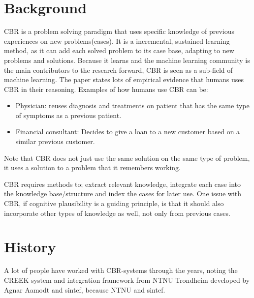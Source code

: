 \documentclass[11pt, letterpaper]{report}
\numberwithin{equation}{section}
\begin{document}
\section{Background}
CBR is a problem solving paradigm that uses specific knowledge of previous
experiences on new problems(cases). It is a incremental, sustained learning
method, as it can add each solved problem to its case base, adapting to new
problems and solutions. Because it learns and
the machine learning community is the main contributors to the research forward,
CBR is seen as a sub-field of machine learning. The paper states lots
of empirical evidence that humans uses CBR in their reasoning. Examples of how
humans use CBR can be:
\begin{itemize}
\item{Physician:} reuses diagnosis and treatments on patient that has the same
  type of symptoms as a previous patient.
\item{Financial consultant:} Decides to give a loan to a new customer based on
    a similar previous customer.
\end{itemize}

Note that CBR does not just use the same solution on the same type of problem,
it uses a solution to a problem that it remembers working.

CBR requires methods to; extract relevant knowledge, integrate each case into
the knowledge base/structure and index the cases for later use. One issue with
CBR, if cognitive plausibility is a guiding principle, is that it should also
incorporate other types of knowledge as well, not only from previous cases.

\section{History}
A lot of people have worked with CBR-systems through the years, noting the CREEK
system and integration framework from NTNU Trondheim developed by Agnar Aamodt
and sintef, because NTNU and sintef.
\end{document}
